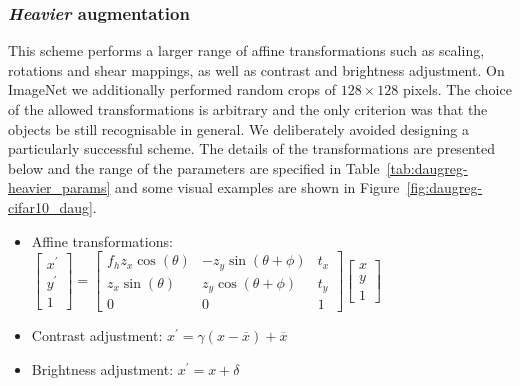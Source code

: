 {\subsubsection{\textit{Heavier} augmentation}
This scheme performs a larger range of affine transformations such as scaling, rotations and shear mappings, as well as contrast and brightness adjustment. On ImageNet we additionally performed random crops of $128\times128$ pixels. The choice of the allowed transformations is arbitrary and the only criterion was that the objects be still recognisable in general. We deliberately avoided designing a particularly successful scheme. The details of the transformations are presented below and the range of the parameters are specified in Table~\ref{tab:daugreg-heavier_params} and some visual examples are shown in Figure~\ref{fig:daugreg-cifar10_daug}.

\begin{itemize}
  \item Affine transformations: 
  \vspace{5pt} \\
    $
      \begin{bmatrix}
      x^\prime \\
      y^\prime \\
      1
      \end{bmatrix}
      = 
      \begin{bmatrix}
      f_h z_x \cos(\theta) & -z_y \sin(\theta + \phi) & t_x \\
      z_x \sin(\theta) & z_y \cos(\theta + \phi) & t_y \\
      0 & 0 & 1
    \end{bmatrix}
    \begin{bmatrix}
      x \\
      y \\
      1
      \end{bmatrix}
    $
  \item Contrast adjustment: $x^\prime = \gamma (x - \overline{x}) + \overline{x}$

  \item Brightness adjustment: $x^\prime = x + \delta$
\end{itemize}

}
